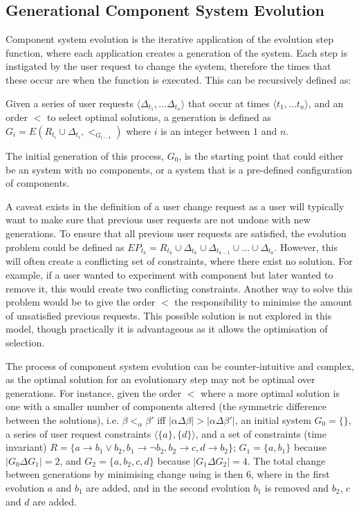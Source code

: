 \subsection{Generational Component System Evolution}
\label{formal.evo}
Component system evolution is the iterative application of the evolution step function, where each application creates a generation of the system.
Each step is instigated by the user request to change the system, therefore the times that these occur are when the function is executed.
This can be recursively defined as:
\begin{defs}
Given a series of user requests $\langle \Delta_{t_1},\ldots \Delta_{t_n} \rangle$ that occur at times $\langle t_1,\ldots t_n \rangle$, and an order $<$ to select optimal solutions, 
a generation is defined as $G_i = E(R_{t_i} \cup \Delta_{t_i},<_{G_{i-1}})$ where $i$ is an integer between $1$ and $n$.
\end{defs}
The initial generation of this process, $G_0$, is the starting point that could either be an system with no components, or a system that is a pre-defined configuration of components.

A caveat exists in the definition of a user change request as a user will typically want to make sure that previous user requests are not undone with new generations.
To ensure that all previous user requests are satisfied, the evolution problem could be defined as 
$EP_{t_k} = R_{t_k} \cup \Delta_{t_k} \cup \Delta_{t_{k-1}} \cup \ldots \cup \Delta_{t_{0}}$.
However, this will often create a conflicting set of constraints, where there exist no solution.
For example, if a user wanted to experiment with component but later wanted to remove it, this would create two conflicting constraints.
Another way to solve this problem would be to give the order $<$ the responsibility to minimise the amount of unsatisfied previous requests.
This possible solution is not explored in this model, though practically it is advantageous as it allows the optimisation of selection.

The process of component system evolution can be counter-intuitive and complex, as the optimal solution for an evolutionary step may not be optimal over generations.
For instance, given the order $<$ where a more optimal solution is one with a smaller number of components altered (the symmetric difference between the solutions), 
i.e. $\beta <_{\alpha} \beta'$ iff $|\alpha \Delta \beta| > |\alpha \Delta \beta'|$,
an initial system $G_0 = \{\}$, a series of user request constraints $\langle \{a\}, \{d\}\rangle$, 
and a set of constraints (time invariant) $R = \{a \rightarrow b_1 \vee b_2, b_1 \rightarrow \neg b_2, b_2 \rightarrow c, d \rightarrow b_2\}$;
$G_1 = \{a,b_1\}$ because $|G_0 \Delta G_1| = 2$, and $G_2 = \{a,b_2,c,d\}$ because $|G_1 \Delta G_2| = 4$.
The total change between generations by minimising change using is then $6$, where in the first evolution $a$ and $b_1$ are added, 
and in the second evolution $b_1$ is removed and $b_2$, $c$ and $d$ are added.

